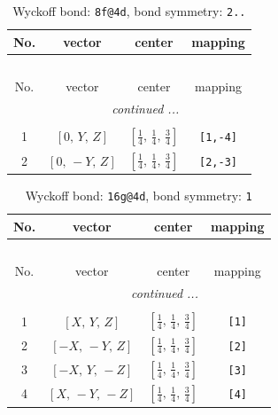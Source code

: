 \documentclass[fleqn,8pt]{jsarticle}
\begin{document}
\begin{longtable}{cccc}
\caption{Wyckoff bond: {\tt 8f@4d}, bond symmetry: {\tt 2..}}
 \\
 \hline \hline
No. & vector & center & mapping \\ \hline \endfirsthead

\multicolumn{3}{l}{\tablename\ \thetable{}} \\
 \hline \hline
No. & vector & center & mapping \\ \hline \endhead

 \hline \hline
\multicolumn{3}{r}{\footnotesize\it continued ...} \\ \endfoot

 \hline \hline
\multicolumn{3}{r}{} \\ \endlastfoot

1 & $\left[ 0,\, Y,\, Z \right]$ & $\left[ \frac{1}{4},\, \frac{1}{4},\, \frac{3}{4} \right]$ & {\tt [1,-4]} \\ \hline
2 & $\left[ 0,\, - Y,\, Z \right]$ & $\left[ \frac{1}{4},\, \frac{1}{4},\, \frac{3}{4} \right]$ & {\tt [2,-3]} \\
\end{longtable}
\renewcommand{\arraystretch}{1.2}
\begin{longtable}{cccc}
\caption{Wyckoff bond: {\tt 16g@4d}, bond symmetry: {\tt 1}}
 \\
 \hline \hline
No. & vector & center & mapping \\ \hline \endfirsthead

\multicolumn{3}{l}{\tablename\ \thetable{}} \\
 \hline \hline
No. & vector & center & mapping \\ \hline \endhead

 \hline \hline
\multicolumn{3}{r}{\footnotesize\it continued ...} \\ \endfoot

 \hline \hline
\multicolumn{3}{r}{} \\ \endlastfoot

1 & $\left[ X,\, Y,\, Z \right]$ & $\left[ \frac{1}{4},\, \frac{1}{4},\, \frac{3}{4} \right]$ & {\tt [1]} \\ \hline
2 & $\left[ - X,\, - Y,\, Z \right]$ & $\left[ \frac{1}{4},\, \frac{1}{4},\, \frac{3}{4} \right]$ & {\tt [2]} \\ \hline
3 & $\left[ - X,\, Y,\, - Z \right]$ & $\left[ \frac{1}{4},\, \frac{1}{4},\, \frac{3}{4} \right]$ & {\tt [3]} \\ \hline
4 & $\left[ X,\, - Y,\, - Z \right]$ & $\left[ \frac{1}{4},\, \frac{1}{4},\, \frac{3}{4} \right]$ & {\tt [4]} \\
\end{longtable}
\end{document}

